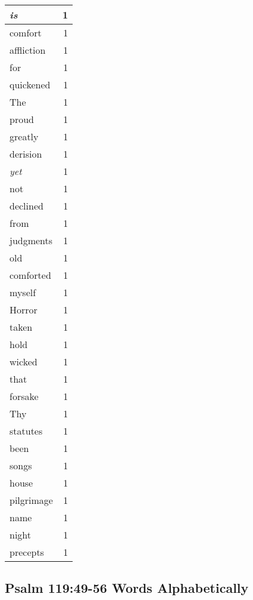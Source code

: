\begin{center}
\begin{longtable}{l|r}
\emph{is} & 1\\ \hline 
comfort & 1\\ \hline 
affliction & 1\\ \hline 
for & 1\\ \hline 
quickened & 1\\ \hline 
The & 1\\ \hline 
proud & 1\\ \hline 
greatly & 1\\ \hline 
derision & 1\\ \hline 
\emph{yet} & 1\\ \hline 
not & 1\\ \hline 
declined & 1\\ \hline 
from & 1\\ \hline 
judgments & 1\\ \hline 
old & 1\\ \hline 
comforted & 1\\ \hline 
myself & 1\\ \hline 
Horror & 1\\ \hline 
taken & 1\\ \hline 
hold & 1\\ \hline 
wicked & 1\\ \hline 
that & 1\\ \hline 
forsake & 1\\ \hline 
Thy & 1\\ \hline 
statutes & 1\\ \hline 
been & 1\\ \hline 
songs & 1\\ \hline 
house & 1\\ \hline 
pilgrimage & 1\\ \hline 
name & 1\\ \hline 
night & 1\\ \hline 
precepts & 1\\ \hline 
\end{longtable}
\end{center}





\subsection{Psalm  119:49-56 Words Alphabetically}


\normalsize
 
